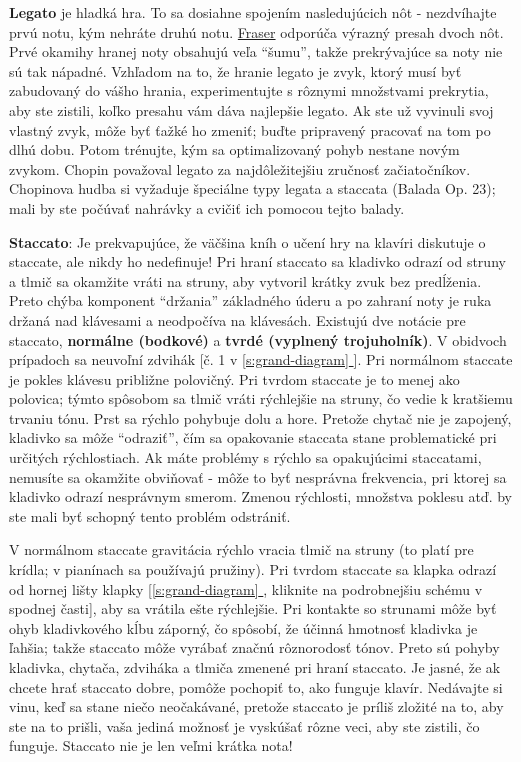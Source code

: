 \documentclass[11pt,a4paper]{book}
\newcommand*{\fullref}[1]{\hyperref[{#1}]{\ref*{#1} \nameref*{#1}}} %
\begin{document}
\textbf{Legato} je hladká hra. To sa dosiahne spojením nasledujúcich nôt - nezdvíhajte prvú notu, kým nehráte druhú notu. \hyperlink{r:fraser}{Fraser} odporúča výrazný presah dvoch nôt. Prvé okamihy hranej noty obsahujú veľa “šumu”, takže prekrývajúce sa noty nie sú tak nápadné. Vzhľadom na to,  že hranie legato je zvyk, ktorý musí byť zabudovaný do vášho hrania, experimentujte s rôznymi množstvami prekrytia, aby ste zistili, koľko presahu vám dáva najlepšie legato. Ak ste už vyvinuli svoj vlastný zvyk, môže byť ťažké ho zmeniť; buďte pripravený pracovať na tom po dlhú dobu. Potom trénujte, kým sa optimalizovaný pohyb nestane novým zvykom. Chopin považoval legato za najdôležitejšiu zručnosť začiatočníkov. Chopinova hudba si vyžaduje špeciálne typy legata a staccata (Balada Op. 23); mali by ste počúvať nahrávky a cvičiť ich pomocou tejto balady.

\textbf{Staccato}: Je prekvapujúce, že väčšina kníh o učení hry na klavíri diskutuje o staccate, ale nikdy ho nedefinuje! Pri hraní staccato sa kladivko odrazí od struny a tlmič sa okamžite vráti na struny, aby vytvoril krátky zvuk bez predĺženia. Preto chýba komponent “držania” základného úderu a po zahraní noty je ruka držaná nad klávesami a neodpočíva na klávesách. Existujú dve notácie pre staccato, \textbf{normálne (bodkové)} a \textbf{tvrdé (vyplnený trojuholník)}. V obidvoch prípadoch sa neuvoľní zdvihák [č. 1 v \fullref{s:grand-diagram}]. Pri normálnom staccate je pokles klávesu približne polovičný. Pri tvrdom staccate je to menej ako polovica; týmto spôsobom sa tlmič vráti rýchlejšie na struny, čo vedie k kratšiemu trvaniu tónu. Prst sa rýchlo pohybuje dolu a hore. Pretože chytač nie je zapojený, kladivko sa môže “odraziť”, čím sa opakovanie staccata stane problematické pri určitých rýchlostiach. Ak máte problémy s rýchlo sa opakujúcimi staccatami, nemusíte sa okamžite obviňovať - ​​môže to byť nesprávna frekvencia, pri ktorej sa kladivko odrazí nesprávnym smerom. Zmenou rýchlosti, množstva poklesu atď. by ste mali byť schopný tento problém odstrániť.

V normálnom staccate gravitácia rýchlo vracia tlmič na struny (to platí pre krídla; v pianínach sa používajú pružiny). Pri tvrdom staccate sa klapka odrazí od hornej lišty klapky [\fullref{s:grand-diagram}, kliknite na podrobnejšiu schému v spodnej časti], aby sa vrátila ešte rýchlejšie. Pri kontakte so strunami môže byť ohyb kladivkového kĺbu záporný, čo spôsobí, že účinná hmotnosť kladivka je ľahšia; takže staccato môže vyrábať značnú rôznorodosť tónov. Preto sú pohyby kladivka, chytača, zdviháka a tlmiča zmenené pri hraní staccato. Je jasné, že ak chcete hrať staccato dobre, pomôže pochopiť to, ako funguje klavír. Nedávajte si vinu, keď sa stane niečo neočakávané, pretože staccato je príliš zložité na to, aby ste na to prišli, vaša jediná možnosť je vyskúšať rôzne veci, aby ste zistili, čo funguje. Staccato nie je len veľmi krátka nota!
\end{document}
